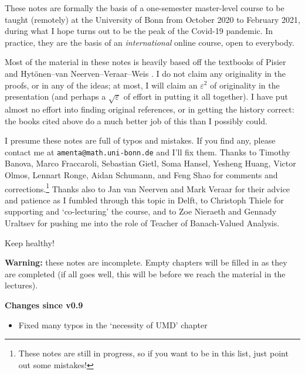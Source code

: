 These notes are formally the basis of a one-semester master-level course to be taught (remotely) at the University of Bonn from October 2020 to February 2021, during what I hope turns out to be the peak of the Covid-19 pandemic.
In practice, they are the basis of an \emph{international} online course, open to everybody.

Most of the material in these notes is heavily based off the textbooks of Pisier \cite{gP16} and Hyt\"onen--van Neerven--Veraar--Weis \cite{HNVW16, HNVW17}.
I do not claim any originality in the proofs, or in any of the ideas; at most, I will claim an $\varepsilon^2$ of originality in the presentation (and perhaps a $\sqrt{\varepsilon}$ of effort in putting it all together).
I have put almost no effort into finding original references, or in getting the history correct: the books cited above do a much better job of this than I possibly could.

\vspace{1cm}

I presume these notes are full of typos and mistakes.
If you find any, please contact me at \texttt{amenta@math.uni-bonn.de} and I'll fix them.
Thanks to Timothy Banova, Marco Fraccaroli, Sebastian Gietl, Soma Hansel, Yesheng Huang, Victor Olmos, Lennart Ronge, Aidan Schumann, and Feng Shao for comments and corrections.\footnote{These notes are still in progress, so if you want to be in this list, just point out some mistakes!}
Thanks also to Jan van Neerven and Mark Veraar for their advice and patience as I fumbled through this topic in Delft, to Christoph Thiele for supporting and `co-lecturing' the course, and to Zoe Nieraeth and Gennady Uraltsev for pushing me into the role of Teacher of Banach-Valued Analysis.

\vspace{0.5cm}

Keep healthy! 




\vspace{1cm}

\textbf{Warning:} these notes are incomplete.
Empty chapters will be filled in as they are completed (if all goes well, this will be before we reach the material in the lectures).

\textbf{Changes since v0.9}
\begin{itemize}
\item Fixed many typos in the `necessity of UMD' chapter
\end{itemize}

